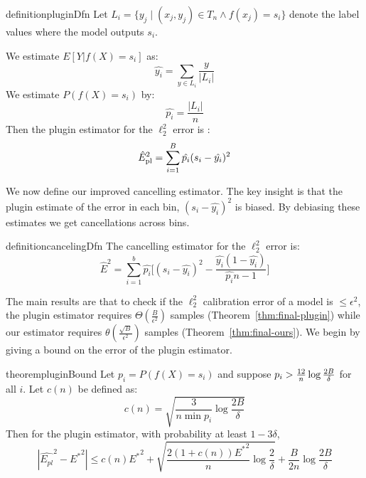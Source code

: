 \begin{restatable}{definition}{pluginDfn}
\label{dfn:plugin-estimator}
  Let $L_i = \{ y_j \; | \; (x_j, y_j) \in T_n\wedge f(x_j) = s_i \}$  denote the label values where the model outputs $s_i$.

We estimate $E[Y | f(X) = s_i]$ as:
\[ \hat{y_i} = \sum_{y \in L_i} \frac{y}{|L_i|} \] 
We estimate $P(f(X) = s_i)$ by:
\[ \hat{p_i} = \frac{|L_i|}{n} \]
  Then the plugin estimator for the $\ell_2^2$ error is :
\[ \hat{E}_{\textup{pl}}^2{} = \sum_{i=1}^B \hat{p_i} (s_i - \hat{y_i})^2 \]
\end{restatable}

We now define our improved cancelling estimator. The key insight is that the plugin estimate of the error in each bin, $(s_i - \hat{y_i})^2$ is biased. By debiasing these estimates we get cancellations across bins.

\begin{restatable}{definition}{cancelingDfn}
The cancelling estimator for the $\ell_2^2$ error is:
\[ \hat{E}^2 = \sum_{i=1}^b \hat{p_i} \Big[ (s_i - \hat{y_i})^2 - \frac{\hat{y_i}(1 - \hat{y_i})}{\hat{p_i}n-1} \Big] \]
\end{restatable}

The main results are that to check if the $\ell_2^2$ calibration error of a model is $\leq \epsilon^2$, the plugin estimator requires $\Theta(\frac{B}{\epsilon^2})$ samples (Theorem~\ref{thm:final-plugin}) while our estimator requires $\theta(\frac{\sqrt{B}}{\epsilon^2})$ samples (Theorem~\ref{thm:final-ours}). We begin by giving a bound on the error of the plugin estimator. 

\begin{restatable}{theorem}{pluginBound}
\label{thm:plugin-bound}
Let $p_i = P(f(X) = s_i)$ and suppose $p_i > \frac{12}{n}\log{\frac{2B}{\delta}}{}$ for all $i$. Let $c(n)$ be defined as:
\[ c(n) = \sqrt{\frac{3}{n \min p_i} \log{\frac{2B}{\delta}}} \]
Then for the plugin estimator, with probability at least $1 - 3\delta$,
\[ | \hat{E_{pl}}^2 - {E^*}^2 | \leq c(n){E^*}^2 + \sqrt{\frac{2(1+c(n)){E^*}^2}{n} \log{\frac{2}{\delta}}} + \frac{B}{2n} \log{\frac{2B}{\delta}} \]
\end{restatable}

